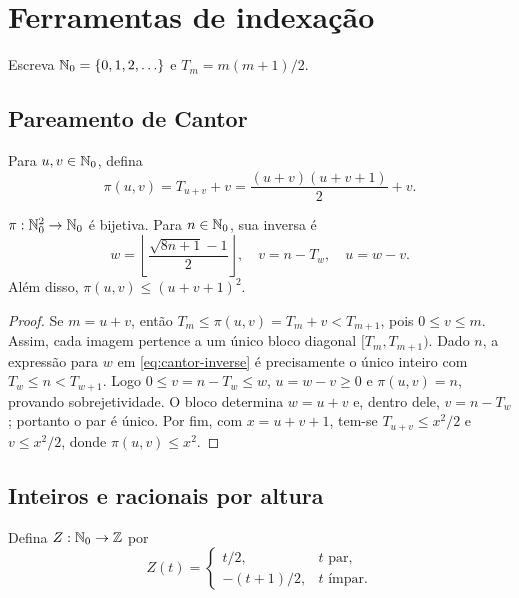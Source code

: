 \section{Ferramentas de indexação}
\label{sec:indexing}

Escreva $\mathbb{N}_0=\{0,1,2,\ldots\}$ e $T_m=m(m+1)/2$.

\subsection{Pareamento de Cantor}

Para $u,v\in\mathbb{N}_0$, defina
\begin{equation}
 \pi(u,v)=T_{u+v}+v=\frac{(u+v)(u+v+1)}2+v.
 \label{eq:cantor}
\end{equation}

\begin{lemma}\label{lem:cantor}
$\pi:\mathbb{N}_0^2\to\mathbb{N}_0$ é bijetiva. Para $n\in\mathbb{N}_0$, sua inversa é
\begin{equation}
 w=\left\lfloor\frac{\sqrt{8n+1}-1}{2}\right\rfloor,
 \quad v=n-T_w,\quad u=w-v.
 \label{eq:cantor-inverse}
\end{equation}
Além disso, $\pi(u,v)\le (u+v+1)^2$.
\end{lemma}

\begin{proof}
Se $m=u+v$, então $T_m\le \pi(u,v)=T_m+v<T_{m+1}$, pois $0\le v\le m$. Assim, cada imagem pertence a um único bloco diagonal $[T_m,T_{m+1})$. Dado $n$, a expressão para $w$ em \eqref{eq:cantor-inverse} é precisamente o único inteiro com $T_w\le n<T_{w+1}$. Logo $0\le v=n-T_w\le w$, $u=w-v\ge0$ e $\pi(u,v)=n$, provando sobrejetividade. O bloco determina $w=u+v$ e, dentro dele, $v=n-T_w$; portanto o par é único. Por fim, com $x=u+v+1$, tem-se $T_{u+v}\le x^2/2$ e $v\le x^2/2$, donde $\pi(u,v)\le x^2$.
\end{proof}

\subsection{Inteiros e racionais por altura}

Defina $Z:\mathbb{N}_0\to\mathbb{Z}$ por
\begin{equation}
 Z(t)=\begin{cases}t/2,&t\text{ par},\\-(t+1)/2,&t\text{ ímpar}.
 \end{cases}
 \label{eq:integer-enum}
\end{equation}

